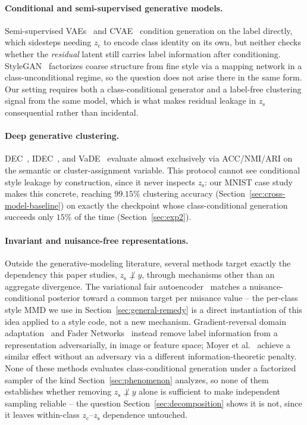 \documentclass[10pt,letterpaper]{article}
\newcommand{\zc}{z_{\mathrm{c}}}
\newcommand{\zs}{z_{\mathrm{s}}}
\begin{document}
\paragraph{Conditional and semi-supervised generative models.}
Semi-supervised VAEs~\citep{kingma2014semi} and
CVAE~\citep{sohn2015learning} condition generation on the label directly,
which sidesteps needing $\zc$ to encode class identity on its own, but
neither checks whether the \emph{residual} latent still carries label
information after conditioning. StyleGAN~\citep{karras2019style} factorizes
coarse structure from fine style via a mapping network in a
class-unconditional regime, so the question does not arise there in the
same form. Our setting requires both a class-conditional generator and a
label-free clustering signal from the same model, which is what makes
residual leakage in $\zs$ consequential rather than incidental.

\paragraph{Deep generative clustering.}
DEC~\citep{xie2015unsupervised}, IDEC~\citep{guo2017improved}, and
VaDE~\citep{jiang2016variational} evaluate almost exclusively via
ACC/NMI/ARI on the semantic or cluster-assignment variable. This protocol
cannot see conditional style leakage by construction, since it never
inspects $\zs$: our MNIST case study makes this concrete, reaching
$99.15\%$ clustering accuracy (Section~\ref{sec:cross-model-baseline}) on
exactly the checkpoint whose class-conditional generation succeeds only
$15\%$ of the time (Section~\ref{sec:exp2}).

\paragraph{Invariant and nuisance-free representations.}
Outside the generative-modeling literature, several methods target exactly
the dependency this paper studies, $\zs\not\perp y$, through mechanisms
other than an aggregate divergence. The variational fair
autoencoder~\citep{louizos2015variational} matches a nuisance-conditional
posterior toward a common target per nuisance value -- the per-class style
MMD we use in Section~\ref{sec:general-remedy} is a direct instantiation of
this idea applied to a style code, not a new mechanism. Gradient-reversal
domain adaptation~\citep{ganin2015unsupervised} and Fader
Networks~\citep{lample2017fader} instead remove label information from a
representation adversarially, in image or feature space; Moyer et
al.~\citep{moyer2018invariant} achieve a similar effect without an
adversary via a different information-theoretic penalty. None of these
methods evaluates class-conditional generation under a factorized sampler
of the kind Section~\ref{sec:phenomenon} analyzes, so none of them
establishes whether removing $\zs\not\perp y$ alone is sufficient to make
independent sampling reliable -- the question Section~\ref{sec:decomposition}
shows it is not, since it leaves within-class $\zc$--$\zs$ dependence
untouched.
\end{document}
